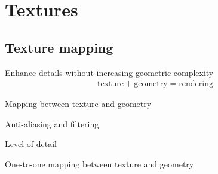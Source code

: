 \chapter{Textures}
\section{Texture mapping}
Enhance details without increasing geometric complexity
\begin{gather*}
	\text{texture}+\text{geometry}=\text{rendering}
\end{gather*}
\begin{compactdesc}
	\item[\lp{Issues}]
\begin{enumerate*}[label=\protect\circled{\arabic*},itemjoin=]
	\item Mapping between texture and geometry\\
	\item Anti-aliasing and filtering\\
	\item Level-of detail\\
	\item One-to-one mapping between texture and geometry\\
\end{enumerate*}

\end{compactdesc}
